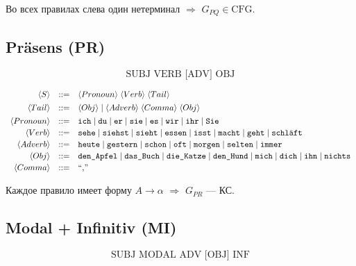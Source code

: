 \documentclass[areasetadvanced]{scrartcl}
\newcommand{\term}[1]{\text{\texttt{#1}}}
\begin{document}
Во всех правилах слева один нетерминал $\Rightarrow$ $G_{PQ}\in\text{CFG}$.

\bigskip
\subsection{Präsens (\textbf{PR})}
\[
  \text{SUBJ VERB [ADV] OBJ}
\]

\[
\begin{array}{rcl}
\langle S\rangle &::=&
  \langle Pronoun\rangle\;
  \langle Verb\rangle\;
  \langle Tail\rangle \\[4pt]

\langle Tail\rangle &::=&
      \langle Obj\rangle
  \mid \langle Adverb\rangle\;\langle Comma\rangle\;\langle Obj\rangle \\[4pt]

\langle Pronoun\rangle &::=&
  \term{ich}\mid\term{du}\mid\term{er}\mid\term{sie}\mid
  \term{es}\mid\term{wir}\mid\term{ihr}\mid\term{Sie} \\[2pt]

\langle Verb\rangle &::=&
  \term{sehe}\mid\term{siehst}\mid\term{sieht}\mid
  \term{essen}\mid\term{isst}\mid\term{macht}\mid
  \term{geht}\mid\term{schläft} \\[2pt]

\langle Adverb\rangle &::=&
  \term{heute}\mid\term{gestern}\mid\term{schon}\mid
  \term{oft}\mid\term{morgen}\mid\term{selten}\mid\term{immer} \\[2pt]

\langle Obj\rangle &::=&
  \term{den\_Apfel}\mid\term{das\_Buch}\mid\term{die\_Katze}\mid
  \term{den\_Hund}\mid\term{mich}\mid\term{dich}\mid
  \term{ihn}\mid\term{nichts} \\[2pt]

\langle Comma\rangle &::=& \text{``,''}
\end{array}
\]



Каждое правило имеет форму $A\to\alpha$ $\Rightarrow$ $G_{PR}$ — КС.

\bigskip
\subsection{Modal + Infinitiv (\textbf{MI})}
\[
  \text{SUBJ MODAL ADV [OBJ] INF}
\]
\end{document}
